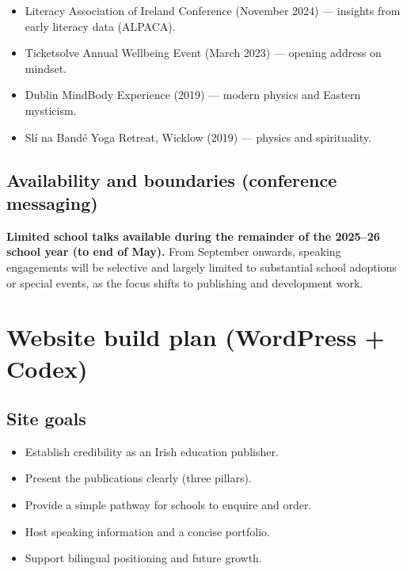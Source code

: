 \documentclass[11pt,a4paper]{article}
\renewcommand{\emoji}[1]{}
\begin{document}
\begin{itemize}
  \item Literacy Association of Ireland Conference (November 2024) --- insights from early literacy data (ALPACA).
  \item Ticketsolve Annual Wellbeing Event (March 2023) --- opening address on mindset.
  \item Dublin MindBody Experience (2019) --- modern physics and Eastern mysticism.
  \item Sl\'i na Band\'e Yoga Retreat, Wicklow (2019) --- physics and spirituality.
\end{itemize}

\subsection{Availability and boundaries (conference messaging)}

\begin{tcolorbox}[
  colback=white,
  colframe=teal!60!black,
  opacityframe=0.5,
  fonttitle=\bfseries\color{white},
  title={\emoji{handshake} Accountability Tools --- Speaking availability statement (draft)},
  drop shadow
]
\textbf{Limited school talks available during the remainder of the 2025--26 school year (to end of May).}
From September onwards, speaking engagements will be selective and largely limited to substantial school adoptions or special events, as the focus shifts to publishing and development work.
\end{tcolorbox}

\section{Website build plan (WordPress + Codex)}

\subsection{Site goals}

\begin{itemize}
  \item Establish credibility as an Irish education publisher.
  \item Present the publications clearly (three pillars).
  \item Provide a simple pathway for schools to enquire and order.
  \item Host speaking information and a concise portfolio.
  \item Support bilingual positioning and future growth.
\end{itemize}
\end{document}
